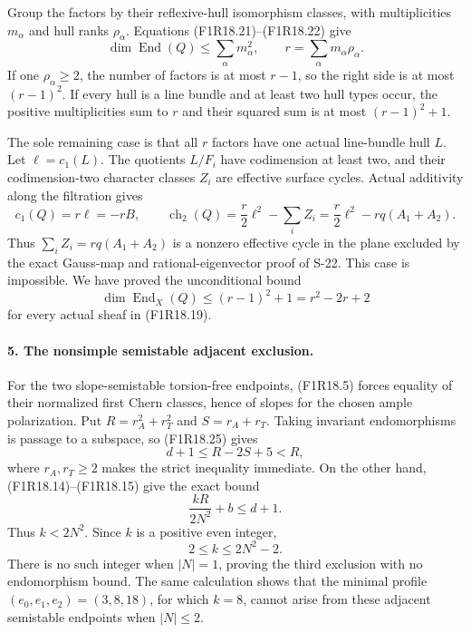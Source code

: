 Group the factors by their reflexive-hull isomorphism
classes, with multiplicities $m_\alpha$ and hull ranks
$\rho_\alpha$. Equations (F1R18.21)--(F1R18.22) give
\[
       \dim\operatorname{End}(Q)\le\sum_\alpha m_\alpha^2,
        \qquad r=\sum_\alpha m_\alpha\rho_\alpha.
 \tag{F1R18.23}
\]
If one $\rho_\alpha\ge2$, the number of factors is
at most $r-1$, so the right side is at most $(r-1)^2$.
If every hull is a line bundle and at least two hull
types occur, the positive multiplicities sum to $r$
and their squared sum is at most $(r-1)^2+1$.

The sole remaining case is that all $r$ factors have
one actual line-bundle hull $L$. Let $\ell=c_1(L)$.
The quotients $L/F_i$ have codimension at least two,
and their codimension-two character classes $Z_i$ are
effective surface cycles. Actual additivity along the
filtration gives
\[
      c_1(Q)=r\ell=-rB,\qquad
      \operatorname{ch}_2(Q)
          =\frac r2\ell^2-\sum_i Z_i
          =\frac r2\ell^2-rq(A_1+A_2).
 \tag{F1R18.24}
\]
Thus $\sum_i Z_i=rq(A_1+A_2)$ is a nonzero effective
cycle in the plane excluded by the exact Gauss-map and
rational-eigenvector proof of S-22. This case is
impossible. We have proved the unconditional bound
\[
       \dim\operatorname{End}_X(Q)\le(r-1)^2+1
                                      =r^2-2r+2
 \tag{F1R18.25}
\]
for every actual sheaf in (F1R18.19).

\paragraph{5. The nonsimple semistable adjacent exclusion.}
For the two slope-semistable torsion-free endpoints,
(F1R18.5) forces equality of their normalized first
Chern classes, hence of slopes for the chosen ample
polarization. Put
$R=r_A^2+r_T^2$ and $S=r_A+r_T$. Taking invariant
endomorphisms is passage to a subspace, so
(F1R18.25) gives
\[
                              d+1\le R-2S+5<R,
 \tag{F1R18.26}
\]
where $r_A,r_T\ge2$ makes the strict inequality
immediate. On the other hand, (F1R18.14)--(F1R18.15)
give the exact bound
\[
                         \frac{kR}{2N^2}+b\le d+1.
 \tag{F1R18.27}
\]
Thus $k<2N^2$. Since $k$ is a positive even integer,
\[
                             2\le k\le2N^2-2.
 \tag{F1R18.28}
\]
There is no such integer when $|N|=1$, proving the
third exclusion with no endomorphism bound. The same
calculation shows that the minimal profile
$(e_0,e_1,e_2)=(3,8,18)$, for which $k=8$, cannot
arise from these adjacent semistable endpoints when
$|N|\le2$.

